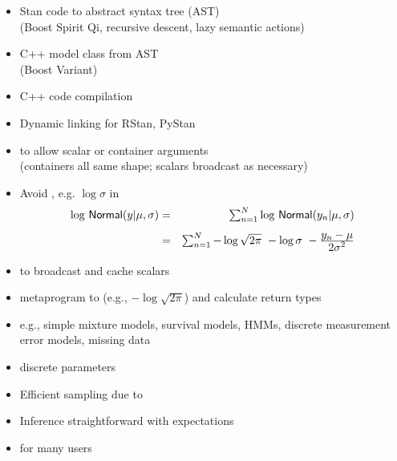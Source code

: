 \documentclass[10pt]{report}
\newcommand{\sld}[1]{\newpage{\noindent\LARGE \ \ \
    \textcolor{MidnightBlue}{\bfseries #1}}\vspace*{4pt}}
\newcommand{\myemph}[1]{{\color{MidnightBlue}{\bfseries #1}}}
\begin{document}
\sld{Parsing and Compilation}
\begin{itemize}
\item Stan code \myemph{parsed} to abstract syntax tree (AST)
\\ {\footnotesize (Boost Spirit Qi, recursive descent, lazy semantic
  actions)}
\item C++ model class \myemph{code generation} from AST
\\ {\footnotesize (Boost Variant)}
\item C++ code compilation
\item Dynamic linking for RStan, PyStan
\end{itemize}

\sld{Coding Probability Functions}
\begin{itemize}
\item \myemph{Vectorized} to allow scalar or container arguments
\\ {\footnotesize (containers all same shape; scalars broadcast as necessary)}
\item Avoid \myemph{repeated computations}, e.g. $\log \sigma$ in
\hspace*{-18pt}
{\small
\begin{eqnarray*}
\textstyle \log \, \mbox{\sf Normal}(y | \mu, \sigma)
& = & \textstyle \sum_{n=1}^N \log \, \mbox{\sf Normal}(y_n | \mu,\sigma)
\\[4pt]
& = & \textstyle \sum_{n=1}^N  - \log \sqrt{2\pi} \ - \log \sigma \ -
\frac{\textstyle y_n - \mu}{\textstyle 2\sigma^2}
\end{eqnarray*}
}
\item \myemph{expression templates} to broadcast and cache scalars
\item \myemph{traits} metaprogram to \myemph{drop constants} (e.g., $-\log
  \sqrt{2 \pi}$) and calculate return types
\end{itemize}

\sld{Models with Discrete Parameters}
\begin{itemize}
\item e.g., simple mixture models, survival models, HMMs,
      discrete measurement error models, missing data
\item \myemph{Marginalize out} discrete parameters
\item Efficient sampling due to \myemph{Rao-Blackwellization}
\item Inference straightforward with expectations
\item \myemph{Difficult} for many users
\end{itemize}
\end{document}
